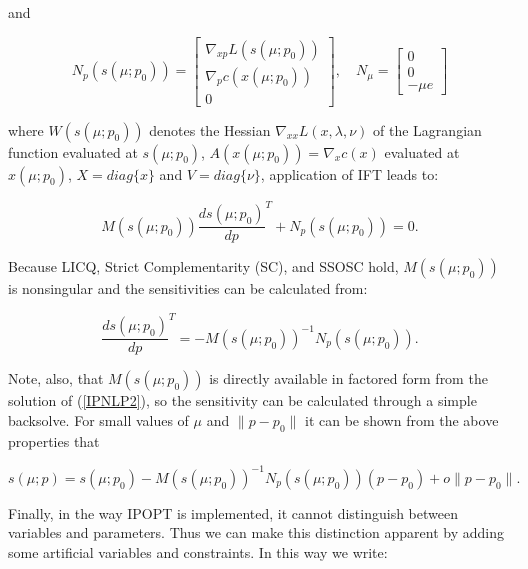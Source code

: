 \documentclass[letter, 11pt]{article}
\newcommand{\vect}[1]{{\left[\begin{array}{c} #1 \end{array}\right]}}
\newcommand{\parens}[1]{\ensuremath{\left( #1 \right)}}
\newcommand{\bracs}[1]{\ensuremath{\left[ #1 \right]}}
\newcommand{\func}[2]{\ensuremath{ #1\parens{#2}  }}
\begin{document}
\noindent and

\begin{equation}  \label{ndef}
N_p(s(\mu; p_0)) =
\vect{\nabla_{xp} L(s(\mu; p_0)) \\ \nabla_p c(x(\mu; p_0))\\ 0}, \quad
N_{\mu} = \vect{0 \\ 0 \\ -\mu e}
\end{equation}

\noindent where $W(s(\mu; p_0))$ denotes the Hessian $\nabla_{xx} L(x
,\lambda, \nu)$ of the Lagrangian function evaluated at $s(\mu; p_0)$,
$A(x(\mu; p_0)) = \nabla_{x} c(x)$ evaluated at $x(\mu; p_0)$, $X =
diag\{x\}$ and $V = diag\{\nu\}$, application of IFT leads to:

\begin{equation}\label{sensfiacco}
M(s(\mu; p_0)) \frac{d s(\mu; p_0)}{d p}^T + N_p(s(\mu; p_0)) = 0.
\end{equation}

Because LICQ, Strict Complementarity (SC), and SSOSC
hold, $M(s(\mu; p_0))$ is nonsingular and
the sensitivities can be calculated from:

\begin{equation} \label{sens:1}
\frac{d s(\mu; p_0)}{d p}^T =   - \func{M}{\func{s}{\mu; p_0}}^{-1} \func{N_p}{ \func{s}{\mu; p_0} } .
\end{equation}

Note, also, that $M(s(\mu; p_0))$ is directly available in factored form
from the solution of (\ref{IPNLP2}), so the sensitivity can be calculated
through a simple backsolve. For small values of $\mu$ and $\|p-p_0\|$
it can be shown from the above properties \cite{Fiacco1983} that

\begin{equation} \label{init1}
s(\mu; p) = s(\mu; p_0) - M(s(\mu; p_0))^{-1}N_p(s(\mu; p_0)) (p-p_0) +
o\|p-p_0\| . %
\end{equation}

%


Finally, in the way IPOPT is implemented, it cannot distinguish between
variables and parameters. Thus we can make this distinction apparent by
adding some artificial variables and constraints. In this way we write:
\end{document}
